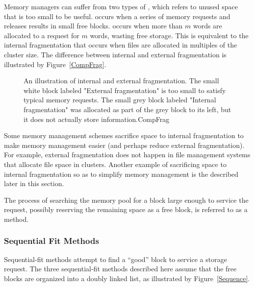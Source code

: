 Memory managers can suffer from two types of
,
which refers to unused space that is too small to be useful.
occurs when a series of memory requests and releases results in small
free blocks.
occurs when more than $m$ words are
allocated to a request for $m$ words, wasting free storage.
This is equivalent to the internal fragmentation that occurs when
files are allocated in multiples of the cluster size.
The difference between internal and external fragmentation is
illustrated by Figure~\ref{CompFrag}.

\begin{figure}
\vspace{-\medskipamount}\vspace{-\smallskipamount}
{An illustration of internal and external fragmentation.
The small white block labeled "External fragmentation" is too small
to satisfy typical memory requests.
The small grey block labeled "Internal fragmentation" was allocated as
part of the grey block to its left, but it does not actually store
information.}{CompFrag}
\bigskip
\end{figure}

Some memory management schemes sacrifice space to internal
fragmentation to make memory management easier (and perhaps reduce
external fragmentation).
For example, external fragmentation does not happen in file management
systems that allocate file space in clusters.
Another example of sacrificing space to internal fragmentation so as
to simplify memory management is the 
described later in this section.

The process of searching the memory pool for a block large enough to
service the request, possibly reserving the remaining space as a free
block, is referred to as
a  
method.


\subsubsection{Sequential Fit Methods}
\label{MemSequential}

Sequential-fit
methods attempt to find a ``good'' block to service a storage request.
The three sequential-fit methods described here assume that the free
blocks are organized into a doubly linked list, as illustrated by
Figure~\ref{Sequence}.

